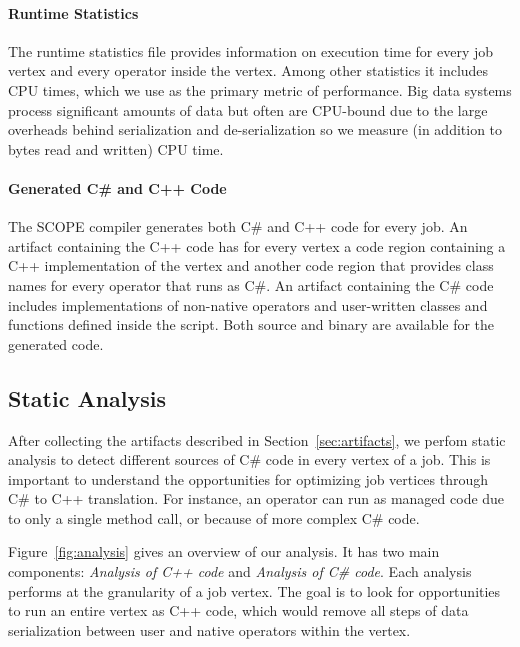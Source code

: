 \paragraph{Runtime Statistics}
The runtime statistics file provides information on execution time for every job vertex and every operator inside the vertex. Among other statistics it includes CPU times, which we use as the primary metric of performance. Big data systems process significant amounts of data but often are CPU-bound\cite{ousterhout-nsdi15} due to the large overheads behind serialization and de-serialization so we measure (in addition to bytes read and written) CPU time.



\paragraph{Generated C\# and C++ Code}
The SCOPE compiler generates both C\# and C++ code for every job.
An artifact containing the C++ code has for every vertex a code region containing a C++ implementation of the vertex and another code region that provides class names for every operator that runs as C\#.
An artifact containing the C\# code includes implementations of non-native operators and user-written classes and functions defined inside the script.
Both source and binary are available for the generated code.

\subsection{Static Analysis}

After collecting the artifacts described in Section~\ref{sec:artifacts}, we perfom static analysis to detect different sources of C\# code in every vertex of a job. This is important to understand the opportunities for optimizing job vertices through C\# to C++ translation. For instance, an operator can run as managed code due to only a single method call, or because of more complex C\# code.

Figure~\ref{fig:analysis} gives an overview of our analysis. It has two main components: \emph{Analysis of C++ code} and \emph{Analysis of C\# code}. Each analysis performs at the granularity of a job vertex. The goal is to look for opportunities to run an entire vertex as C++ code, which would remove all steps of data serialization between user and native operators within the vertex.


